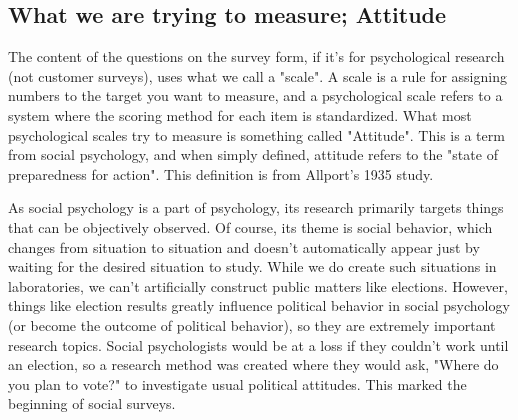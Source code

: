 \documentclass{ltjsbook}
\begin{document}
\subsection{What we are trying to measure; Attitude}
The content of the questions on the survey form, if it's for psychological research (not customer surveys), uses what we call a "scale". A scale is a rule for assigning numbers to the target you want to measure, and a psychological scale refers to a system where the scoring method for each item is standardized. What most psychological scales try to measure is something called "Attitude". This is a term from social psychology, and when simply defined, attitude refers to the "state of preparedness for action". This definition is from Allport's 1935 study.

As social psychology is a part of psychology, its research primarily targets things that can be objectively observed. Of course, its theme is social behavior, which changes from situation to situation and doesn't automatically appear just by waiting for the desired situation to study. While we do create such situations in laboratories, we can't artificially construct public matters like elections. However, things like election results greatly influence political behavior in social psychology (or become the outcome of political behavior), so they are extremely important research topics. Social psychologists would be at a loss if they couldn't work until an election, so a research method was created where they would ask, "Where do you plan to vote?" to investigate usual political attitudes. This marked the beginning of social surveys.
\end{document}
